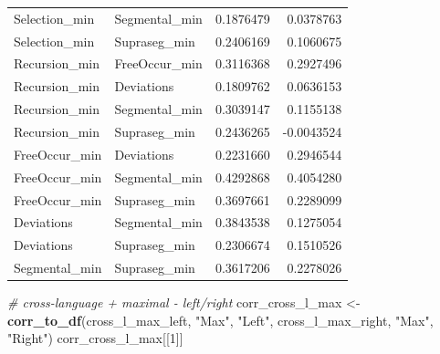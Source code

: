 \documentclass[
]{article}
\newenvironment{Shaded}{\begin{snugshade}}{\end{snugshade}}
\newcommand{\CommentTok}[1]{\textcolor[rgb]{0.56,0.35,0.01}{\textit{#1}}}
\newcommand{\DecValTok}[1]{\textcolor[rgb]{0.00,0.00,0.81}{#1}}
\newcommand{\FunctionTok}[1]{\textcolor[rgb]{0.13,0.29,0.53}{\textbf{#1}}}
\newcommand{\NormalTok}[1]{#1}
\newcommand{\OtherTok}[1]{\textcolor[rgb]{0.56,0.35,0.01}{#1}}
\newcommand{\StringTok}[1]{\textcolor[rgb]{0.31,0.60,0.02}{#1}}
\begin{document}
\begin{longtable}[]{@{}llrr@{}}
Selection\_min & Segmental\_min & 0.1876479 & 0.0378763 \\
Selection\_min & Supraseg\_min & 0.2406169 & 0.1060675 \\
Recursion\_min & FreeOccur\_min & 0.3116368 & 0.2927496 \\
Recursion\_min & Deviations & 0.1809762 & 0.0636153 \\
Recursion\_min & Segmental\_min & 0.3039147 & 0.1155138 \\
Recursion\_min & Supraseg\_min & 0.2436265 & -0.0043524 \\
FreeOccur\_min & Deviations & 0.2231660 & 0.2946544 \\
FreeOccur\_min & Segmental\_min & 0.4292868 & 0.4054280 \\
FreeOccur\_min & Supraseg\_min & 0.3697661 & 0.2289099 \\
Deviations & Segmental\_min & 0.3843538 & 0.1275054 \\
Deviations & Supraseg\_min & 0.2306674 & 0.1510526 \\
Segmental\_min & Supraseg\_min & 0.3617206 & 0.2278026 \\
\end{longtable}

\begin{Shaded}
\begin{Highlighting}[]
\CommentTok{\# cross{-}language + maximal {-} left/right}
\NormalTok{corr\_cross\_l\_max }\OtherTok{\textless{}{-}} \FunctionTok{corr\_to\_df}\NormalTok{(cross\_l\_max\_left, }\StringTok{"Max"}\NormalTok{, }\StringTok{"Left"}\NormalTok{, cross\_l\_max\_right, }\StringTok{"Max"}\NormalTok{, }\StringTok{"Right"}\NormalTok{)}
\NormalTok{corr\_cross\_l\_max[[}\DecValTok{1}\NormalTok{]]}
\end{Highlighting}
\end{Shaded}
\end{document}
